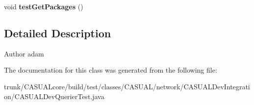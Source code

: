 \begin{DoxyCompactItemize}
\item 
\hypertarget{class_c_a_s_u_a_l_1_1network_1_1_c_a_s_u_a_l_dev_integration_1_1_c_a_s_u_a_l_dev_querier_test_a91d908eebd6d52781553e1b4e01341b7}{void {\bfseries test\-Get\-Packages} ()}\label{class_c_a_s_u_a_l_1_1network_1_1_c_a_s_u_a_l_dev_integration_1_1_c_a_s_u_a_l_dev_querier_test_a91d908eebd6d52781553e1b4e01341b7}

\end{DoxyCompactItemize}


\subsection{Detailed Description}
\begin{DoxyAuthor}{Author}
adam 
\end{DoxyAuthor}


The documentation for this class was generated from the following file\-:\begin{DoxyCompactItemize}
\item 
trunk/\-C\-A\-S\-U\-A\-Lcore/build/test/classes/\-C\-A\-S\-U\-A\-L/network/\-C\-A\-S\-U\-A\-L\-Dev\-Integration/C\-A\-S\-U\-A\-L\-Dev\-Querier\-Test.\-java\end{DoxyCompactItemize}
